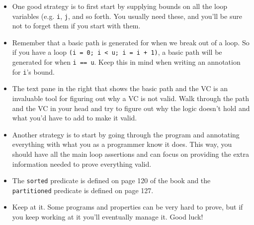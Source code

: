 \documentclass{article}
\begin{document}
\begin{itemize}
\item One good strategy is to first start by supplying bounds on all the loop variables (e.g. \texttt{i}, \texttt{j}, and so forth.  You usually need these, and you'll be sure not to forget them if you start with them.
\item Remember that a basic path is generated for when we break out of a loop.  So if you have a loop
\texttt{(i = 0; i < u; i = i + 1)},
a basic path will be generated for when \texttt{i == u}.  Keep this in mind when writing an annotation for \texttt{i}'s bound.
\item The text pane in the right that shows the basic path and the VC is an invaluable tool for figuring out why a VC is not valid.  Walk through the path and the VC in your head and try to figure out why the logic doesn't hold and what you'd have to add to make it valid.
\item Another strategy is to start by going through the program and annotating everything with what you as a programmer know it does.  This way, you should have all the main loop assertions and can focus on providing the extra information needed to prove everything valid.
\item The \texttt{sorted} predicate is defined on page 120 of the book and the \texttt{partitioned} predicate is defined on page 127. %
\item Keep at it.  Some programs and properties can be very hard to prove, but if you keep working at it you'll eventually manage it.  Good luck!
\end{itemize}
\end{document}
